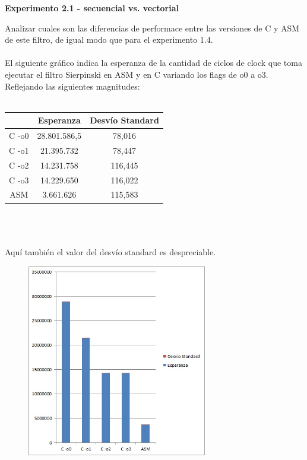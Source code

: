 \vspace*{0.3cm} \noindent
\textbf{Experimento 2.1 - secuencial vs. vectorial}

Analizar cuales son las diferencias de performace entre las versiones de C 
y ASM de este filtro, de igual modo que para el experimento 1.4. \\
\\
El siguiente gr\'afico indica la esperanza de la cantidad de ciclos de clock que toma ejecutar el filtro Sierpinski en ASM y en C variando los flags de o0 a o3. \\
Reflejando las siguientes magnitudes: \\
\\
 \begin{tabular}[c]{|c|c|c|}
	\hline
		 & Esperanza & Desv\'io Standard\\
		\hline
C -o0 & 28.801.586,5 & 78,016 \\
\hline
C -o1 & 21.395.732 & 78,447 \\
\hline
C -o2 & 14.231.758 & 116,445 \\
\hline
C -o3 & 14.229.650 & 116,022 \\
\hline
ASM & 3.661.626 & 115,583 \\
\hline
	\end{tabular}\\\\
\\
Aqu\'i tambi\'en el valor del desv\'io standard es despreciable. \\
\newpage
\begin{figure}
  \begin{center}
	\includegraphics[width=0.7\textwidth]{imagenes/21.jpg}
  \end{center}
\end{figure}
\newpage

